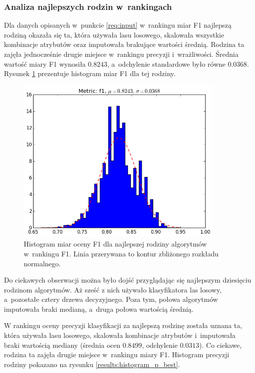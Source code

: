 \documentclass[../thesis.tex]{subfiles}
\begin{document}
\subsubsection{Analiza najlepszych rodzin w~rankingach}

Dla danych opisanych w~punkcie \ref{req:input} w~rankingu miar F1 najlepszą rodziną okazała się ta, która używała lasu losowego, skalowała wszystkie kombinacje atrybutów oraz imputowała brakujące wartości średnią. Rodzina ta zajęła jednocześnie drugie miejsce w~rankingu precyzji i~wrażliwości. Średnia wartość miary F1 wynosiła $0.8243$, a~odchylenie standardowe było równe $0.0368$. Rysunek \ref{results:histogram_f1_best} prezentuje histogram miar F1 dla tej rodziny.

\begin{figure}[h]
\centering
\includegraphics[width=0.9\textwidth]{10-f1.png}
\caption{Histogram miar oceny F1 dla najlepszej rodziny algorytmów w~rankingu F1. Linia przerywana to kontur zbliżonego rozkładu normalnego.}
\label{results:histogram_f1_best}
\end{figure}

Do ciekawych obserwacji można było dojść przyglądając się najlepszym dziesięciu rodzinom algorytmów. Aż sześć z nich używało klasyfikatora las losowy, a~pozostałe cztery drzewa decyzyjnego. Poza tym, połowa algorytmów imputowała braki medianą, a~druga połowa wartością średnią. 

W rankingu oceny precyzji klasyfikacji za najlepszą rodzinę została uznana ta, która używała lasu losowego, skalowała kombinacje atrybutów i~imputowała braki wartością mediany (średnia ocen $0.8499$, odchylenie $0.0313$). Co ciekawe, rodzina ta zajęła drugie miejsce w~rankingu miary F1. Histogram precyzji rodziny pokazano na rysunku \ref{results:histogram_p_best}.
\end{document}
